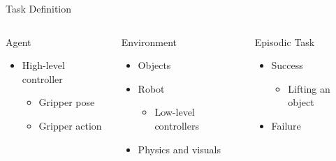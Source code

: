 \begin{frame}{Task Definition}{}
    \begin{columns}%
        \begin{column}{0.28\textwidth}%
            \begin{block}{Agent}
                \begin{itemize}
                    \item High-level controller
                          \begin{itemize}
                              \item Gripper pose
                              \item Gripper action
                          \end{itemize}
                \end{itemize}
            \end{block}
        \end{column}
        \begin{column}{0.32\textwidth}%
            \begin{block}{Environment}
                \begin{itemize}
                    \item Objects
                    \item Robot
                          \begin{itemize}
                              \item Low-level controllers
                          \end{itemize}
                    \item Physics and visuals
                \end{itemize}
            \end{block}
        \end{column}
        \begin{column}{0.35\textwidth}%
            \begin{block}{Episodic Task}
                \begin{itemize}
                    \item Success
                          \begin{itemize}
                              \item Lifting an object
                          \end{itemize}
                    \item Failure
                          \begin{itemize}

\end{itemize}
\end{itemize}
\end{block}
\end{column}
\end{columns}
\end{frame}
